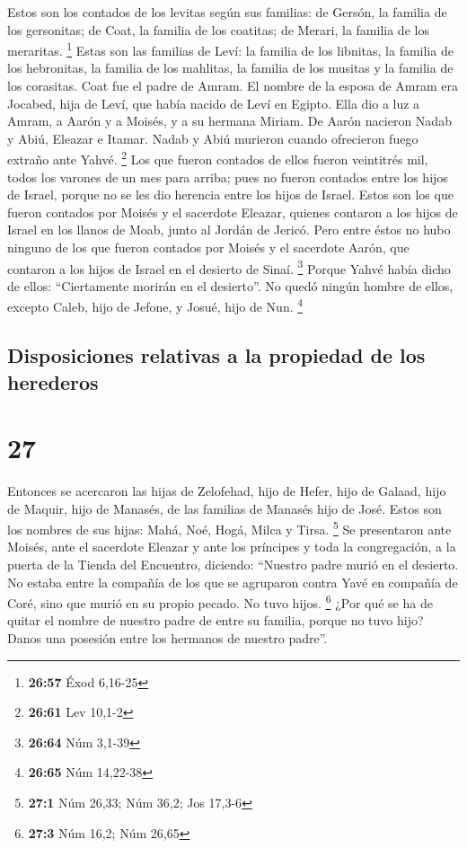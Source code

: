  Estos son los contados de los levitas según sus
familias: de Gersón, la familia de los gersonitas; de Coat, la familia
de los coatitas; de Merari, la familia de los meraritas. \footnote{\textbf{26:57}
  Éxod 6,16-25}  Estas son las familias de Leví: la
familia de los libnitas, la familia de los hebronitas, la familia de los
mahlitas, la familia de los musitas y la familia de los corasitas. Coat
fue el padre de Amram.  El nombre de la esposa de Amram
era Jocabed, hija de Leví, que había nacido de Leví en Egipto. Ella dio
a luz a Amram, a Aarón y a Moisés, y a su hermana Miriam.
 De Aarón nacieron Nadab y Abiú, Eleazar e Itamar.
 Nadab y Abiú murieron cuando ofrecieron fuego extraño
ante Yahvé. \footnote{\textbf{26:61} Lev 10,1-2}  Los que
fueron contados de ellos fueron veintitrés mil, todos los varones de un
mes para arriba; pues no fueron contados entre los hijos de Israel,
porque no se les dio herencia entre los hijos de Israel. 
Estos son los que fueron contados por Moisés y el sacerdote Eleazar,
quienes contaron a los hijos de Israel en los llanos de Moab, junto al
Jordán de Jericó.  Pero entre éstos no hubo ninguno de
los que fueron contados por Moisés y el sacerdote Aarón, que contaron a
los hijos de Israel en el desierto de Sinaí. \footnote{\textbf{26:64}
  Núm 3,1-39}  Porque Yahvé había dicho de ellos:
``Ciertamente morirán en el desierto''. No quedó ningún hombre de ellos,
excepto Caleb, hijo de Jefone, y Josué, hijo de Nun. \footnote{\textbf{26:65}
  Núm 14,22-38}

\hypertarget{disposiciones-relativas-a-la-propiedad-de-los-herederos}{%
\subsection{Disposiciones relativas a la propiedad de los
herederos}\label{disposiciones-relativas-a-la-propiedad-de-los-herederos}}

\hypertarget{section-26}{%
\section{27}\label{section-26}}

 Entonces se acercaron las hijas de Zelofehad, hijo de
Hefer, hijo de Galaad, hijo de Maquir, hijo de Manasés, de las familias
de Manasés hijo de José. Estos son los nombres de sus hijas: Mahá, Noé,
Hogá, Milca y Tirsa. \footnote{\textbf{27:1} Núm 26,33; Núm 36,2; Jos
  17,3-6}  Se presentaron ante Moisés, ante el sacerdote
Eleazar y ante los príncipes y toda la congregación, a la puerta de la
Tienda del Encuentro, diciendo:  ``Nuestro padre murió en
el desierto. No estaba entre la compañía de los que se agruparon contra
Yavé en compañía de Coré, sino que murió en su propio pecado. No tuvo
hijos. \footnote{\textbf{27:3} Núm 16,2; Núm 26,65}  ¿Por
qué se ha de quitar el nombre de nuestro padre de entre su familia,
porque no tuvo hijo? Danos una posesión entre los hermanos de nuestro
padre''.

